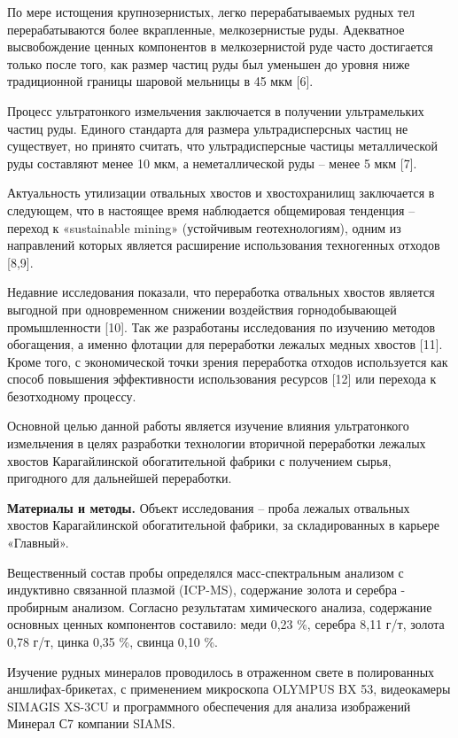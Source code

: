 По мере истощения крупнозернистых, легко перерабатываемых рудных тел
перерабатываются более вкрапленные, мелкозернистые руды. Адекватное
высвобождение ценных компонентов в мелкозернистой руде часто достигается
только после того, как размер частиц руды был уменьшен до уровня ниже
традиционной границы шаровой мельницы в 45 мкм {[}6{]}.

Процесс ультратонкого измельчения заключается в получении ультрамельких
частиц руды. Единого стандарта для размера ультрадисперсных частиц не
существует, но принято считать, что ультрадисперсные частицы
металлической руды составляют менее 10 мкм, а неметаллической руды --
менее 5 мкм {[}7{]}.

Актуальность утилизации отвальных хвостов и хвостохранилищ заключается в
следующем, что в настоящее время наблюдается общемировая тенденция --
переход к «sustainable mining» (устойчивым геотехнологиям), одним из
направлений которых является расширение использования техногенных
отходов {[}8,9{]}.

Недавние исследования показали, что переработка отвальных хвостов
является выгодной при одновременном снижении воздействия горнодобывающей
промышленности {[}10{]}. Так же разработаны исследования по изучению
методов обогащения, а именно флотации для переработки лежалых медных
хвостов {[}11{]}. Кроме того, с экономической точки зрения переработка
отходов используется как способ повышения эффективности использования
ресурсов {[}12{]} или перехода к безотходному процессу.

Основной целью данной работы является изучение влияния ультратонкого
измельчения в целях разработки технологии вторичной переработки лежалых
хвостов Карагайлинской обогатительной фабрики с получением сырья,
пригодного для дальнейшей переработки.

{\bfseries Материалы и методы.} Объект исследования -- проба лежалых
отвальных хвостов Карагайлинской обогатительной фабрики, за
складированных в карьере «Главный».

Вещественный состав пробы определялся масс-спектральным анализом с
индуктивно связанной плазмой (ICP-MS), содержание золота и серебра -
пробирным анализом. Согласно результатам химического анализа, содержание
основных ценных компонентов составило: меди 0,23 \%, серебра 8,11 г/т,
золота 0,78 г/т, цинка 0,35 \%, свинца 0,10 \%.

Изучение рудных минералов проводилось в отраженном свете в полированных
аншлифах-брикетах, с применением микроскопа OLYMPUS BX 53, видеокамеры
SIMAGIS XS-3CU и программного обеспечения для анализа изображений
Минерал С7 компании SIAMS.

